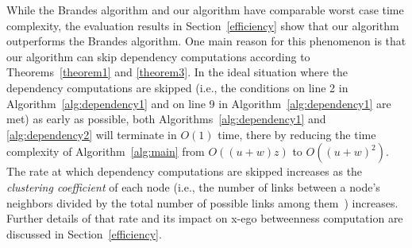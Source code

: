 
While the Brandes algorithm and our algorithm have comparable worst case time complexity, the evaluation results in Section~\ref{efficiency} show that our algorithm outperforms the Brandes algorithm.
One main reason for this phenomenon is that our algorithm can skip dependency computations according to Theorems~\ref{theorem1} and \ref{theorem3}.
In the ideal situation where the dependency computations are skipped (i.e., the conditions on line 2 in Algorithm~\ref{alg:dependency1} and on line 9 in Algorithm~\ref{alg:dependency1} are met) as early as possible, both Algorithms~\ref{alg:dependency1} and \ref{alg:dependency2} will terminate in $O(1)$ time, there by reducing the time complexity of Algorithm~\ref{alg:main} from $O((u + w)z)$ to $O((u+w)^2)$. 
The rate at which dependency computations are skipped increases as the {\em clustering coefficient} of each node (i.e., the number of links between a node's neighbors divided by the total number of possible links among them~\cite{community}) increases.
Further details of that rate and its impact on x-ego betweenness computation are discussed in Section~\ref{efficiency}.
